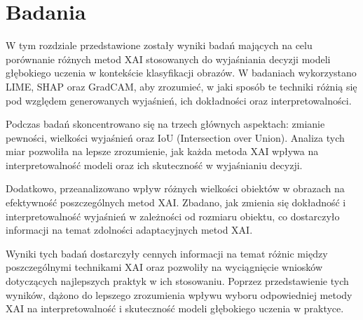 
\chapter*{Badania}

W tym rozdziale przedstawione zostały wyniki badań mających na celu porównanie różnych metod XAI stosowanych do wyjaśniania decyzji modeli głębokiego uczenia w kontekście klasyfikacji obrazów.
W badaniach wykorzystano LIME, SHAP oraz GradCAM, aby zrozumieć, w jaki sposób te techniki różnią się pod względem generowanych wyjaśnień, ich dokładności oraz interpretowalności.

Podczas badań skoncentrowano się na trzech głównych aspektach: zmianie pewności, wielkości wyjaśnień oraz IoU (Intersection over Union).
Analiza tych miar pozwoliła na lepsze zrozumienie, jak każda metoda XAI wpływa na interpretowalność modeli oraz ich skuteczność w wyjaśnianiu decyzji.

Dodatkowo, przeanalizowano wpływ różnych wielkości obiektów w obrazach na efektywność poszczególnych metod XAI.
Zbadano, jak zmienia się dokładność i interpretowalność wyjaśnień w zależności od rozmiaru obiektu, co dostarczyło informacji na temat zdolności adaptacyjnych metod XAI.

Wyniki tych badań dostarczyły cennych informacji na temat różnic między poszczególnymi technikami XAI oraz pozwoliły na wyciągnięcie wniosków dotyczących najlepszych praktyk w ich stosowaniu.
Poprzez przedstawienie tych wyników, dążono do lepszego zrozumienia wpływu wyboru odpowiedniej metody XAI na interpretowalność i skuteczność modeli głębokiego uczenia w praktyce.









%

%


